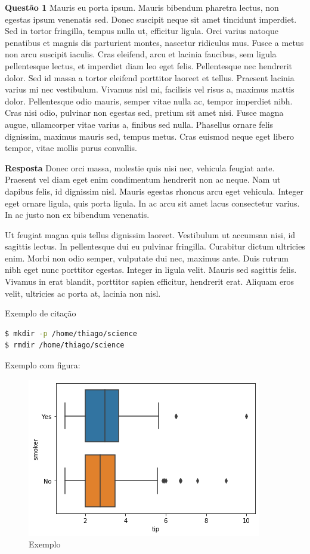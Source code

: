 \textbf{Questão 1}
Mauris eu porta ipsum. Mauris bibendum pharetra lectus, non egestas ipsum venenatis sed. Donec suscipit neque sit amet tincidunt imperdiet. Sed in tortor fringilla, tempus nulla ut, efficitur ligula. Orci varius natoque penatibus et magnis dis parturient montes, nascetur ridiculus mus. Fusce a metus non arcu suscipit iaculis. Cras eleifend, arcu et lacinia faucibus, sem ligula pellentesque lectus, et imperdiet diam leo eget felis. Pellentesque nec hendrerit dolor. Sed id massa a tortor eleifend porttitor laoreet et tellus. Praesent lacinia varius mi nec vestibulum. Vivamus nisl mi, facilisis vel risus a, maximus mattis dolor. Pellentesque odio mauris, semper vitae nulla ac, tempor imperdiet nibh. Cras nisi odio, pulvinar non egestas sed, pretium sit amet nisi. Fusce magna augue, ullamcorper vitae varius a, finibus sed nulla. Phasellus ornare felis dignissim, maximus mauris sed, tempus metus. Cras euismod neque eget libero tempor, vitae mollis purus convallis.

\textbf{Resposta}
Donec orci massa, molestie quis nisi nec, vehicula feugiat ante. Praesent vel diam eget enim condimentum hendrerit non ac neque. Nam ut dapibus felis, id dignissim nisl. Mauris egestas rhoncus arcu eget vehicula. Integer eget ornare ligula, quis porta ligula. In ac arcu sit amet lacus consectetur varius. In ac justo non ex bibendum venenatis.

Ut feugiat magna quis tellus dignissim laoreet. Vestibulum ut accumsan nisi, id sagittis lectus. In pellentesque dui eu pulvinar fringilla. Curabitur dictum ultricies enim. Morbi non odio semper, vulputate dui nec, maximus ante. Duis rutrum nibh eget nunc porttitor egestas. Integer in ligula velit. Mauris sed sagittis felis. Vivamus in erat blandit, porttitor sapien efficitur, hendrerit erat. Aliquam eros velit, ultricies ac porta at, lacinia non nisl. 

Exemplo de citação \cite{Oliveira:2021}


\begin{lstlisting}[language=bash]
$ mkdir -p /home/thiago/science
$ rmdir /home/thiago/science
\end{lstlisting}


\newpage


Exemplo com figura:

\begin{figure}[H]
	\centering
	\includegraphics[width=.8\textwidth]{files/imagem.png}
	\caption{Exemplo}
	\label{fig:exemplo}
\end{figure}